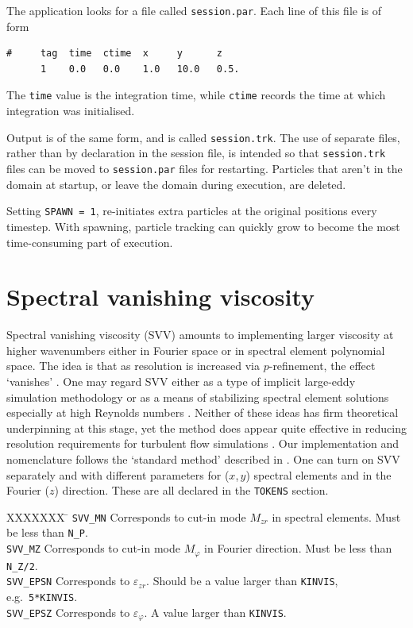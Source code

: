 \documentclass[11pt]{report}
\newcommand{\eg}{e.g.\ } \newcommand{\CC}{\mathrm{c.c.}}
\begin{document}
The application looks for a file called \verb+session.par+.  Each line
of this file is of form
\begin{verbatim}
#     tag  time  ctime  x     y      z
      1    0.0   0.0    1.0   10.0   0.5.
\end{verbatim}
The \verb+time+ value is the integration time, while \verb+ctime+
records the time at which integration was initialised.

Output is of the same form, and is called \verb+session.trk+.  The use
of separate files, rather than by declaration in the session file, is
intended so that \verb+session.trk+ files can be moved to
\verb+session.par+ files for restarting.  Particles that aren't in the
domain at startup, or leave the domain during execution, are deleted.

Setting \verb+SPAWN = 1+, re-initiates extra particles at the original
positions every timestep.  With spawning, particle tracking can
quickly grow to become the most time-consuming part of execution.

\section{Spectral vanishing viscosity}
\label{sec.svv}

Spectral vanishing viscosity (SVV) amounts to implementing larger
viscosity at higher wavenumbers either in Fourier space or in spectral
element polynomial space.  The idea is that as resolution is increased
via $p$-refinement, the effect `vanishes' \citep{tadmor89,mot93}.  One
may regard SVV either as a type of implicit large-eddy simulation
methodology \citep{pasquetti06} or as a means of stabilizing spectral
element solutions especially at high Reynolds numbers
\citep{xupa04,kish06}. Neither of these ideas has firm theoretical
underpinning at this stage, yet the method does appear quite effective
in reducing resolution requirements for turbulent flow simulations
\citep{ksb12,cnbmo15}.  Our implementation and nomenclature follows
the `standard method' described in \citet{ksb12}.  One can turn on SVV
separately and with different parameters for ($x$,\,$y$) spectral
elements and in the Fourier ($z$) direction.  These are all declared
in the \verb+TOKENS+ section.

\begin{tabbing}
XXXXXXX \= \kill
\texttt{SVV\_MN} \> Corresponds to cut-in mode $M_{zr}$ in 
spectral elements. Must be less than \texttt{N\_P}.\\ 
%
\texttt{SVV\_MZ} \> Corresponds to cut-in mode $M_\varphi$ in 
Fourier direction. Must be less than \texttt{N\_Z/2}.\\
%
\texttt{SVV\_EPSN} \> Corresponds to $\varepsilon_{zr}$. 
Should be a value larger than \texttt{KINVIS}, \eg \texttt{5*KINVIS}.\\
%
\texttt{SVV\_EPSZ} \> Corresponds to $\varepsilon_\varphi$. 
A value larger than \texttt{KINVIS}.
\end{tabbing}
\end{document}
